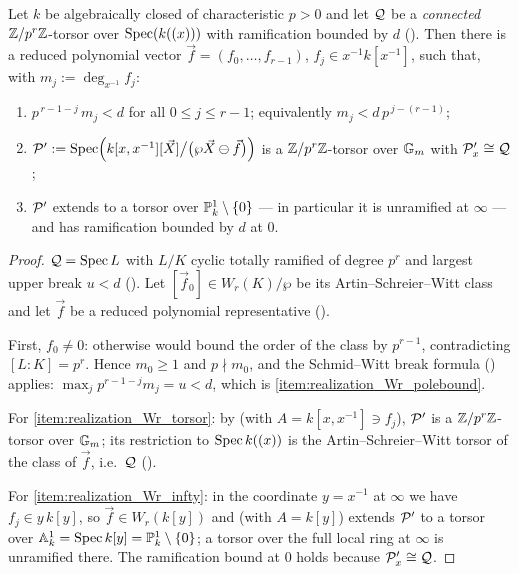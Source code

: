 \begin{lemma}\label{lemma:realization_over_Gm_Wr}
    Let $k$ be algebraically closed of characteristic $p>0$ and let $\mathcal{Q}$ be a
    \emph{connected} $\mathbb{Z}/p^r\mathbb{Z}$-torsor over $\operatorname{Spec}(k((x)))$ with ramification bounded
    by $d$ (). Then there is a reduced
    polynomial vector $\vec f = (f_0, \dots, f_{r-1})$, $f_j \in x^{-1}k[x^{-1}]$,
    such that, with $m_j := \deg_{x^{-1}} f_j$:
    \begin{enumerate}
        \item \label{item:realization_Wr_polebound} $p^{\,r-1-j}\, m_j < d$ for all
        $0 \leq j \leq r-1$; equivalently $m_j < d\, p^{\,j-(r-1)}$;
        \item \label{item:realization_Wr_torsor}
        $\mathcal{P}' := \operatorname{Spec}\Bigl(k[x,x^{-1}][\vec X]\big/\bigl(\wp \vec X \ominus \vec f\bigr)\Bigr)$
        is a $\mathbb{Z}/p^r\mathbb{Z}$-torsor over $\mathbb{G}_m$ with $\mathcal{P}'_x \cong \mathcal{Q}$;
        \item \label{item:realization_Wr_infty} $\mathcal{P}'$ extends to a torsor over
        $\mathbb{P}^1_k \setminus \{0\}$ --- in particular it is unramified at $\infty$ ---
        and has ramification bounded by $d$ at $0$.
    \end{enumerate}
\end{lemma}

\begin{proof}
    $\mathcal{Q} = \operatorname{Spec} L$ with $L/K$ cyclic totally ramified of degree $p^r$ and largest
    upper break $u < d$ (). Let
    $[\vec f_0] \in W_r(K)/\wp$ be its Artin--Schreier--Witt class and let $\vec f$ be
    a reduced polynomial representative
    ().

    First, $f_0 \neq 0$: otherwise
     would bound the order of the class
    by $p^{r-1}$, contradicting $[L:K] = p^r$. Hence $m_0 \geq 1$ and $p \nmid m_0$,
    and the Schmid--Witt break formula
    () applies:
    $\max_j p^{r-1-j} m_j = u < d$, which is \ref{item:realization_Wr_polebound}.

    For \ref{item:realization_Wr_torsor}: by  (with
    $A = k[x,x^{-1}] \ni f_j$), $\mathcal{P}'$ is a $\mathbb{Z}/p^r\mathbb{Z}$-torsor over $\mathbb{G}_m$; its
    restriction to $\operatorname{Spec} k((x))$ is the Artin--Schreier--Witt torsor of the class of
    $\vec f$, i.e.\ $\mathcal{Q}$ ().

    For \ref{item:realization_Wr_infty}: in the coordinate $y = x^{-1}$ at $\infty$ we
    have $f_j \in y\,k[y]$, so $\vec f \in W_r(k[y])$ and
     (with $A = k[y]$) extends $\mathcal{P}'$ to a torsor over
    $\mathbb{A}^1_k = \operatorname{Spec} k[y] = \mathbb{P}^1_k \setminus \{0\}$; a torsor over the full local ring
    at $\infty$ is unramified there. The ramification bound at $0$ holds because
    $\mathcal{P}'_x \cong \mathcal{Q}$.
\end{proof}

